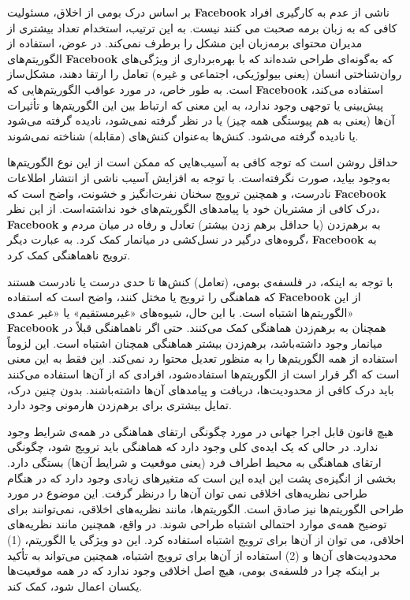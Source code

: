 بر اساس درک بومی از اخلاق، مسئولیت \textenglish{\textbf{Facebook}} ناشی از عدم به کارگیری افراد کافی که به زبان برمه صحبت می کنند نیست.
به این ترتیب، استخدام تعداد بیشتری از مدیران محتوای برمه‌زبان این مشکل را برطرف نمی‌کند.
در عوض، استفاده از الگوریتم‌های \textenglish{\textbf{Facebook}} که به‌گونه‌ای طراحی شده‌اند که با بهره‌برداری از ویژگی‌های روان‌شناختی انسان (یعنی بیولوژیکی، اجتماعی و غیره) تعامل را ارتقا دهند، مشکل‌ساز است.
به طور خاص، در مورد عواقب الگوریتم‌هایی که \textenglish{\textbf{Facebook}} استفاده می‌کند، پیش‌بینی یا توجهی وجود ندارد، به این معنی که ارتباط بین این الگوریتم‌ها و تأثیرات آن‌ها (یعنی به هم پیوستگی همه چیز) یا در نظر گرفته نمی‌شود، نادیده گرفته می‌شود یا نادیده گرفته می‌شود.
کنش‌ها به‌عنوان کنش‌های (مقابله) شناخته نمی‌شوند.

حداقل روشن است که توجه کافی به آسیب‌هایی که ممکن است از این نوع الگوریتم‌ها به‌وجود بیاید، صورت نگرفته‌است.
با توجه به افزایش آسیب ناشی از انتشار اطلاعات نادرست، و همچنین ترویج سخنان نفرت‌انگیز و خشونت، واضح است که \textenglish{\textbf{Facebook}} درک کافی از مشتریان خود یا پیامدهای الگوریتم‌های خود نداشته‌است.
از این نظر، \textenglish{\textbf{Facebook}} به برهم‌زدن (یا حداقل برهم زدن بیشتر) تعادل و رفاه در میان مردم و گروه‌های درگیر در نسل‌کشی در میانمار کمک کرد.
به عبارت دیگر، \textenglish{\textbf{Facebook}} به ترویج ناهماهنگی کمک کرد.

با توجه به اینکه، در فلسفه‌ی بومی، (تعامل) کنش‌ها تا حدی درست یا نادرست هستند که هماهنگی را ترویج یا مختل کنند، واضح است که استفاده \textenglish{\textbf{Facebook}} از این الگوریتم‌ها اشتباه است.
با این حال، شیوه‌های «غیرمستقیم» یا «غیر عمدی» \textenglish{\textbf{Facebook}} همچنان به برهم‌زدن هماهنگی کمک می‌کنند.
حتی اگر ناهماهنگی قبلاً در میانمار وجود داشته‌باشد، برهم‌زدن بیشتر هماهنگی همچنان اشتباه است.
این لزوماً استفاده از همه الگوریتم‌ها را به منظور تعدیل محتوا رد نمی‌کند.
این فقط به این معنی است که اگر قرار است از الگوریتم‌ها استفاده‌شود، افرادی که از آن‌ها استفاده می‌کنند باید درک کافی از محدودیت‌ها، دریافت و پیامدهای آن‌ها داشته‌باشند.
بدون چنین درک، تمایل بیشتری برای برهم‌زدن هارمونی وجود دارد.

هیچ قانون قابل اجرا جهانی در مورد چگونگی ارتقای هماهنگی در همه‌ی شرایط وجود ندارد.
در حالی که یک ایده‌ی کلی وجود دارد که هماهنگی باید ترویج شود، چگونگی ارتقای هماهنگی به محیط اطراف فرد (یعنی موقعیت و شرایط آن‌ها) بستگی دارد.
بخشی از انگیزه‌ی پشت این ایده این است که متغیرهای زیادی وجود دارد که در هنگام طراحی نظریه‌های اخلاقی نمی توان آن‌ها را در‌نظر گرفت.
این موضوع در مورد طراحی الگوریتم‌ها نیز صادق است.
الگوریتم‌ها، مانند نظریه‌های اخلاقی، نمی‌توانند برای توضیح همه‌ی موارد احتمالی اشتباه طراحی شوند.
در واقع، همچنین مانند نظریه‌های اخلاقی، می توان از آن‌ها برای ترویج اشتباه استفاده کرد.
این دو ویژگی یا الگوریتم، (1) محدودیت‌های آن‌ها و (2) استفاده از آن‌ها برای ترویج اشتباه، همچنین می‌تواند به تأکید بر اینکه چرا در فلسفه‌ی بومی، هیچ اصل اخلاقی وجود ندارد که در همه موقعیت‌ها یکسان اعمال شود، کمک کند.


